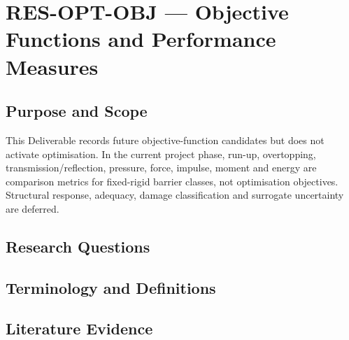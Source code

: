 
\section{RES-OPT-OBJ --- Objective Functions and Performance Measures}
\label{sec:res-opt-obj}

\subsection{Purpose and Scope}
\label{sec:res-opt-obj-purpose}

This Deliverable records future objective-function candidates but does
not activate optimisation. In the current project phase, run-up,
overtopping, transmission/reflection, pressure, force, impulse, moment
and energy are comparison metrics for fixed-rigid barrier classes, not
optimisation objectives. Structural response, adequacy, damage
classification and surrogate uncertainty are deferred.

\subsection{Research Questions}
\label{sec:res-opt-obj-research-questions}


\subsection{Terminology and Definitions}
\label{sec:res-opt-obj-definitions}


\subsection{Literature Evidence}
\label{sec:res-opt-obj-literature-evidence}

